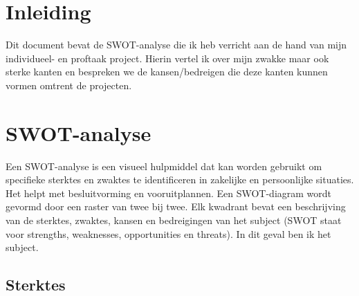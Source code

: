 \documentclass[11pt, twoside]{report}
\begin{document}
    
    \newpage
    \tableofcontents
    \newpage

    \clearpage
    \setcounter{page}{1}

    \chapter{Inleiding}
    \label{ch:inleiding}

    \begin{flushleft}
        Dit document bevat de SWOT-analyse die ik heb verricht aan de hand van mijn individueel- en proftaak project.
        Hierin vertel ik over mijn zwakke maar ook sterke kanten en bespreken we de kansen/bedreigen die deze kanten kunnen vormen omtrent de projecten.
    \end{flushleft}
    \begin{flushleft}
        \newline
    \end{flushleft}
    \newpage


    \chapter{SWOT-analyse}\label{ch:swot-analyse}
    Een SWOT-analyse is een visueel hulpmiddel dat kan worden gebruikt om specifieke sterktes en zwaktes te identificeren in zakelijke en persoonlijke situaties. Het helpt met besluitvorming en vooruitplannen.
    Een SWOT-diagram wordt gevormd door een raster van twee bij twee.
    Elk kwadrant bevat een beschrijving van de sterktes, zwaktes, kansen en bedreigingen van het subject (SWOT staat voor strengths, weaknesses, opportunities en threats). In dit geval ben ik het subject.

    \section{Sterktes}\label{sec:sterktes}
\end{document}
